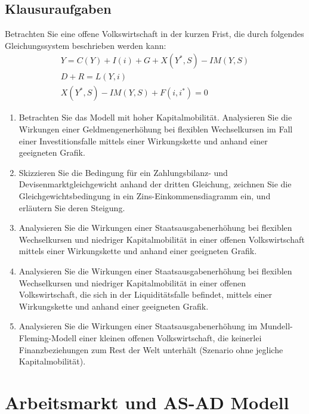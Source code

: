 \documentclass{scrartcl}
\begin{document}
\subsection{Klausuraufgaben}
Betrachten Sie eine offene Volkswirtschaft in der kurzen Frist, die durch folgendes Gleichungssystem beschrieben werden kann:
\begin{align*}
  Y = C(Y)+I(i)+G +X(Y^*,S)-IM(Y,S)\\
  D+R = L(Y,i)\\
  X(Y^*,S) - IM(Y,S)+F(i,i^*)=0
\end{align*}
\begin{enumerate}
  \item Betrachten Sie das Modell mit hoher Kapitalmobilit\"{a}t. Analysieren Sie die Wirkungen einer Geldmengenerh\"{o}hung bei flexiblen Wechselkursen im Fall einer Investitionsfalle mittels einer Wirkungskette und anhand einer geeigneten Grafik.
  \item Skizzieren Sie die Bedingung f\"{u}r ein Zahlungsbilanz- und Devisenmarktgleichgewicht anhand der dritten Gleichung, zeichnen Sie die Gleichgewichtsbedingung in ein Zins-Einkommensdiagramm ein, und erl\"{a}utern Sie deren Steigung.
  \item Analysieren Sie die Wirkungen einer Staatsausgabenerh\"{o}hung bei flexiblen Wechselkursen und niedriger Kapitalmobilit\"{a}t in einer offenen Volkswirtschaft mittels einer Wirkungskette und anhand einer geeigneten Grafik.
  \item Analysieren Sie die Wirkungen einer Staatsausgabenerh\"{o}hung bei flexiblen Wechselkursen und niedriger Kapitalmobilit\"{a}t in einer offenen Volkswirtschaft, die sich in der Liquidit\"{a}tsfalle befindet, mittels einer Wirkungskette und anhand einer geeigneten Grafik.
  \item Analysieren Sie die Wirkungen einer Staatsausgabenerh\"{o}hung im Mundell-Fleming-Modell einer kleinen offenen Volkswirtschaft, die keinerlei Finanzbeziehungen zum Rest der Welt unterh\"{a}lt (Szenario ohne jegliche Kapitalmobilit\"{a}t).
\end{enumerate}
\newpage
\section{Arbeitsmarkt und AS-AD Modell}
\end{document}
